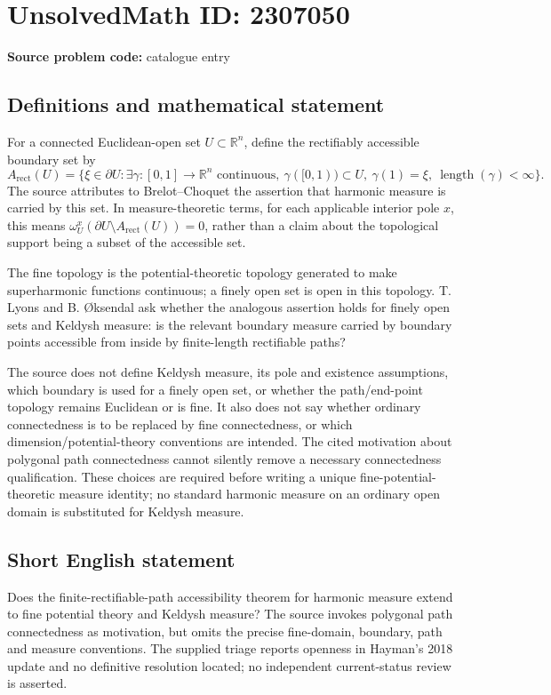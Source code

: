 \documentclass[11pt]{article}
\newcommand{\R}{\mathbb{R}}
\begin{document}
\section*{UnsolvedMath ID: 2307050}
\textbf{Source problem code:} catalogue entry
\subsection{Definitions and mathematical statement}
For a connected Euclidean-open set $U\subset\R^n$, define the rectifiably accessible boundary set by
\[
 A_{\mathrm{rect}}(U)=\{\xi\in\partial U:\exists\gamma:[0,1]\to\R^n\text{ continuous},\
 \gamma([0,1))\subset U,\ \gamma(1)=\xi,\ \operatorname{length}(\gamma)<\infty\}.
\]
The source attributes to Brelot--Choquet the assertion that harmonic measure is carried by this set. In measure-theoretic terms, for each applicable interior pole $x$, this means $\omega_U^x(\partial U\setminus A_{\mathrm{rect}}(U))=0$, rather than a claim about the topological support being a subset of the accessible set.

The fine topology is the potential-theoretic topology generated to make superharmonic functions continuous; a finely open set is open in this topology. T. Lyons and B. Øksendal ask whether the analogous assertion holds for finely open sets and Keldysh measure: is the relevant boundary measure carried by boundary points accessible from inside by finite-length rectifiable paths?

The source does not define Keldysh measure, its pole and existence assumptions, which boundary is used for a finely open set, or whether the path/end-point topology remains Euclidean or is fine. It also does not say whether ordinary connectedness is to be replaced by fine connectedness, or which dimension/potential-theory conventions are intended. The cited motivation about polygonal path connectedness cannot silently remove a necessary connectedness qualification. These choices are required before writing a unique fine-potential-theoretic measure identity; no standard harmonic measure on an ordinary open domain is substituted for Keldysh measure.
\subsection{Short English statement}
Does the finite-rectifiable-path accessibility theorem for harmonic measure extend to fine potential theory and Keldysh measure? The source invokes polygonal path connectedness as motivation, but omits the precise fine-domain, boundary, path and measure conventions. The supplied triage reports openness in Hayman's 2018 update and no definitive resolution located; no independent current-status review is asserted.
\end{document}
